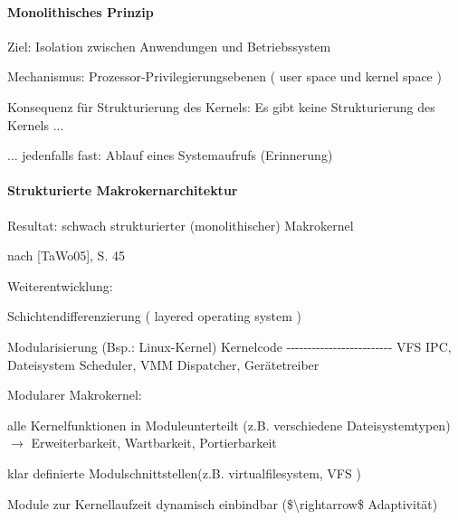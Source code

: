 \documentclass[a4paper]{article}
\begin{document}
\begin{multicols}{3}
    \paragraph{Monolithisches Prinzip}

    \begin{itemize*}
        \item
        Ziel: Isolation zwischen Anwendungen und Betriebssystem
        \item
        Mechanismus: Prozessor-Privilegierungsebenen ( user space und kernel
        space )
        \item
        Konsequenz für Strukturierung des Kernels: Es gibt keine
        Strukturierung des Kernels ...
        \item
        ... jedenfalls fast: Ablauf eines Systemaufrufs (Erinnerung)
    \end{itemize*}


    \paragraph{Strukturierte
        Makrokernarchitektur}

    \begin{itemize*}
        \item
        Resultat: schwach strukturierter (monolithischer) Makrokernel
        \item
        \begin{itemize*}
            \item nach {[}TaWo05{]}, S. 45
        \end{itemize*}
        \item
        Weiterentwicklung:
        \item
        Schichtendifferenzierung ( layered operating system )
        \item
        Modularisierung (Bsp.: Linux-Kernel) \textbar{} Kernelcode \textbar{}
        \textbar{}
        -\/-\/-\/-\/-\/-\/-\/-\/-\/-\/-\/-\/-\/-\/-\/-\/-\/-\/-\/-\/-\/-\/-\/-\/-
        \textbar{} \textbar{} VFS \textbar{} \textbar{} IPC, Dateisystem
        \textbar{} \textbar{} Scheduler, VMM \textbar{} \textbar{} Dispatcher,
        Gerätetreiber \textbar{}
        \item
        Modularer Makrokernel:
        \item
        alle Kernelfunktionen in Moduleunterteilt (z.B. verschiedene
        Dateisystemtypen) $\rightarrow$  Erweiterbarkeit,
        Wartbarkeit, Portierbarkeit
        \item
        klar definierte Modulschnittstellen(z.B. virtualfilesystem, VFS )
        \item
        Module zur Kernellaufzeit dynamisch einbindbar
        (\$\textbackslash rightarrow\$ Adaptivität)
    \end{itemize*}



\end{multicols}
\end{document}
